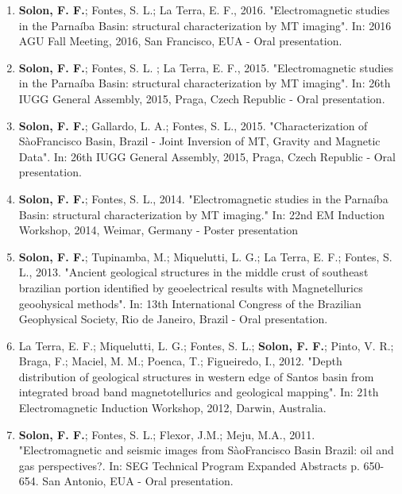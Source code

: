 \documentclass[10pt,a4paper,sans]{moderncv} %
\begin{document}
\begin{enumerate}

\item \textbf{Solon, F. F.}; Fontes, S. L.; La Terra, E. F., 2016. "Electromagnetic studies in the Parna\'{i}ba Basin: structural characterization by MT imaging". In: 2016 AGU Fall Meeting, 2016, San Francisco, EUA - Oral presentation.\\

\item \textbf{Solon, F. F.}; Fontes, S. L. ; La Terra, E. F., 2015. "Electromagnetic studies in the Parna\'{i}ba Basin: structural characterization by MT imaging". In: 26th IUGG General Assembly, 2015, Praga, Czech Republic - Oral presentation.\\

\item \textbf{Solon, F. F.}; Gallardo, L. A.; Fontes, S. L., 2015. "Characterization of S\`{a}oFrancisco Basin, Brazil - Joint Inversion of MT, Gravity and Magnetic Data". In: 26th IUGG General Assembly, 2015, Praga, Czech Republic - Oral presentation. \\

\item \textbf{Solon, F. F.}; Fontes, S. L., 2014. "Electromagnetic studies in the Parna\'{i}ba Basin: structural characterization by MT imaging." In: 22nd EM Induction Workshop, 2014, Weimar, Germany - Poster presentation\\

\item \textbf{Solon, F. F.}; Tupinamba, M.; Miquelutti, L. G.; La Terra, E. F.; Fontes, S. L., 2013. "Ancient geological structures in the middle crust of southeast brazilian portion identified by geoelectrical results with Magnetellurics geoohysical methods". In: 13th International Congress of the Brazilian Geophysical Society, Rio de Janeiro, Brazil - Oral presentation.\\

\item La Terra, E. F.; Miquelutti, L. G.; Fontes, S. L.; \textbf{Solon, F. F.}; Pinto, V. R.; Braga, F.; Maciel, M. M.; Poenca, T.; Figueiredo, I., 2012. "Depth distribution of geological structures in western edge of Santos basin from integrated broad band magnetotellurics and geological mapping". In: 21th Electromagnetic Induction Workshop, 2012, Darwin, Australia.\\

\item \textbf{Solon, F. F.}; Fontes, S. L.; Flexor, J.M.; Meju, M.A., 2011. "Electromagnetic and seismic images from S\`{a}oFrancisco Basin Brazil: oil and gas perspectives?. In: SEG Technical Program Expanded Abstracts p. 650-654. San Antonio, EUA - Oral presentation.\\


\end{enumerate}
\end{document}
